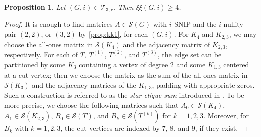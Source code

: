 \documentclass{article}
\newtheorem{proposition}[theorem]{Proposition}
\theoremstyle{definition}
\newcommand{\mptn}{\mathcal{S}} %
\newcommand{\excise}{\xi\xi}
\newcommand{\ttfr}{\mathcal{T}_{3,r}}
\begin{document}
\begin{proposition}
\label{prop:t3}
Let $(G,i)\in\ttfr$.  Then $\excise(G,i) \geq 4$.
\end{proposition}
\begin{proof}
It is enough to find matrices $A\in\mptn(G)$ with $i$-SNIP and the $i$-nullity pair $(2,2)$, or $(3,2)$ by \cref{prop:kk1}, for each $(G,i)$.  For $K_4$ and $K_{2,3}$, we may choose the all-ones matrix in $\mptn(K_4)$ and the adjacency matrix of $K_{2,3}$, respectively.  For each of $T$, $T^{(1)}$, $T^{(2)}$, and $T^{(3)}$, the edge set can be partitioned by some $K_3$ containing a vertex of degree $2$ and some $K_{1,3}$ centered at a cut-vertex; then we choose the matrix as the sum of the all-ones matrix in $\mptn(K_3)$ and the adjacency matrices of the $K_{1,3}$, padding with appropriate zeros.  Such a construction is referred to as the \emph{star-clique sum} introduced in \cite{SK12}.  To be more precise, we choose the following matrices such that $A_0\in\mptn(K_4)$, $A_1\in\mptn(K_{2,3})$, $B_0\in\mptn(T)$, and $B_k\in\mptn(T^{(k)})$ for $k = 1,2,3$.  Moreover, for $B_k$ with $k = 1,2,3$, the cut-vertices are indexed by $7$, $8$, and $9$, if they exist.  


\end{proof}
\end{document}
